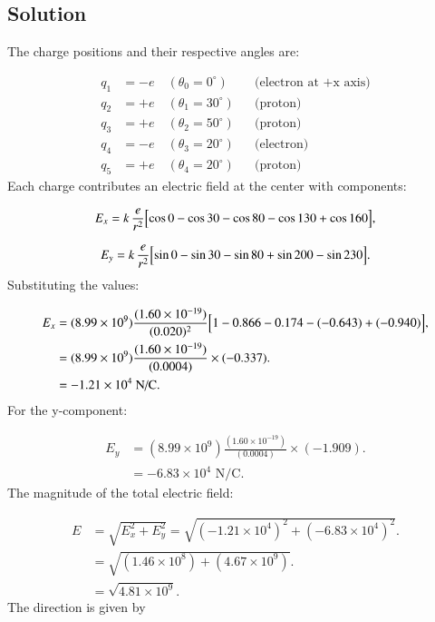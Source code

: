 \documentclass{article}
\begin{document}
\subsection*{Solution}
The charge positions and their respective angles are:

\[
    \begin{aligned}
        q_1 &= -e \quad (\theta_0 = 0^\circ)     && \text{(electron at +x axis)} \\
        q_2 &= +e \quad (\theta_1 = 30^\circ)    && \text{(proton)} \\
        q_3 &= +e \quad (\theta_2 = 50^\circ)    && \text{(proton)} \\
        q_4 &= -e \quad (\theta_3 = 20^\circ)   && \text{(electron)} \\
        q_5 &= +e \quad (\theta_4 = 20^\circ)   && \text{(proton)}
    \end{aligned}
\]
Each charge contributes an electric field at the center with components:

\[
    E_{x} = k\,\frac{e}{r^{2}}\Bigl[\cos0 
                                - \cos30
                                - \cos80
                                - \cos130
                                + \cos160 \Bigr],
\]

\[
    E_{y} = k\,\frac{e}{r^{2}}\Bigl[\sin0 
                                - \sin30
                                - \sin80
                                + \sin200
                                - \sin230 \Bigr].
\]
Substituting the values:

\begin{align*}
	E_{x} &= (8.99 \times 10^9) \frac{(1.60 \times 10^{-19})}{(0.020)^2}
    \Bigl[1 - 0.866 - 0.174 - (-0.643) + (-0.940)\Bigr], \\
	&= (8.99 \times 10^9) \frac{(1.60 \times 10^{-19})}{(0.0004)}
    \times (-0.337). \\
	&= -1.21 \times 10^4 \text{ N/C}.
\end{align*}
For the y-component:

\begin{align*}
	E_{y} &= (8.99 \times 10^9) \frac{(1.60 \times 10^{-19})}{(0.0004)}
    \times (-1.909). \\
	&= -6.83 \times 10^4 \text{ N/C}.
\end{align*}
The magnitude of the total electric field:

\begin{align*}
	E &= \sqrt{E_x^2 + E_y^2} = \sqrt{(-1.21 \times 10^4)^2 + (-6.83 \times 10^4)^2}. \\
	  &= \sqrt{(1.46 \times 10^8) + (4.67 \times 10^9)}. \\
	  &= \sqrt{4.81 \times 10^9}.
\end{align*}
The direction is given by
\end{document}
